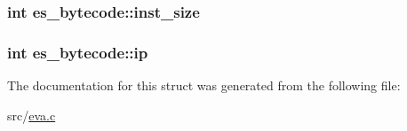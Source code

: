 \hypertarget{structes__bytecode_af4a6b07557646c0878c84a55fa401943}{
\subsubsection[{inst\-\_\-size}]{\setlength{\rightskip}{0pt plus 5cm}int es\-\_\-bytecode\-::inst\-\_\-size}}\label{structes__bytecode_af4a6b07557646c0878c84a55fa401943}
\hypertarget{structes__bytecode_a7730b507b8973e4dcd32b73f342075d9}{
\subsubsection[{ip}]{\setlength{\rightskip}{0pt plus 5cm}int es\-\_\-bytecode\-::ip}}\label{structes__bytecode_a7730b507b8973e4dcd32b73f342075d9}


The documentation for this struct was generated from the following file\-:\begin{DoxyCompactItemize}
\item 
src/\hyperlink{eva_8c}{eva.\-c}\end{DoxyCompactItemize}
